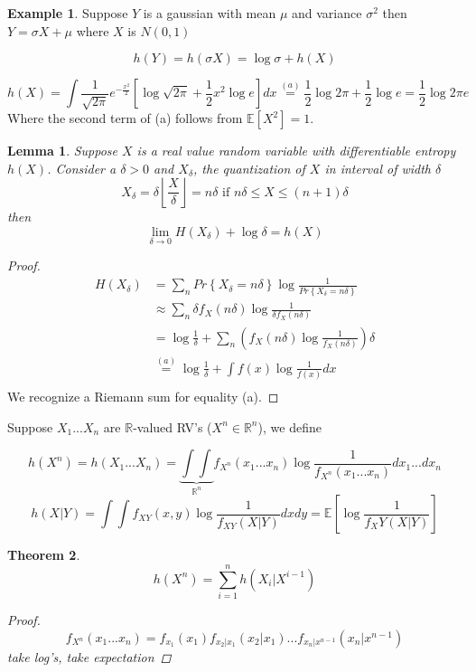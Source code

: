 \documentclass[twoside]{article}
\newtheorem{theorem}{Theorem}[section]
\newtheorem{lemma}[theorem]{Lemma}
\theoremstyle{definition} %
\newtheorem{example}{Example}
\renewcommand{\Pr}[1]{Pr\left\{#1\right\}}
\newcommand{\Ex}[1]{\mathbb{E}\left[#1\right]}
\newcommand{\overeq}[1]{\stackrel{#1}{=}}
\def\R{\mathbb{R}}
\begin{document}
\begin{example}
  Suppose $Y$ is a gaussian with mean $\mu$ and variance $\sigma^2$ then $Y=\sigma X + \mu$ where $X$ is $N(0,1)$

  \[
    h(Y) = h(\sigma X) = \log \sigma + h(X)
  \]

  \[
    h(X) = \int \frac 1 {\sqrt{2\pi}} e^{-\frac {x^2} 2} \left[ \log \sqrt{2\pi} + \frac 1 2 x^2 \log e \right] dx
    \overeq{(a)} \frac 1 2 \log 2\pi + \frac 1 2 \log e = \frac 1 2 \log 2\pi e
  \]
  Where the second term of (a) follows from $\Ex{X^2} = 1$.
\end{example}

\begin{lemma}
  Suppose $X$ is a real value random variable with differentiable entropy $h(X)$. Consider a $\delta > 0$ and $X_\delta$, the quantization of $X$ in interval of width $\delta$
  \[
    X_\delta = \delta \left\lfloor \frac X \delta \right\rfloor = n\delta \text{ if } n\delta \leq X \leq (n+1) \delta
  \]
  then
  \[
    \lim_{\delta \to 0} H(X_\delta) + \log \delta = h(X)
  \]
\end{lemma}

\begin{proof}
\begin{align*}
  H(X_\delta) &= \sum_n \Pr{X_\delta = n\delta} \log \frac 1 {\Pr{X_\delta = n\delta}}\\
  &\approx \sum_n \delta f_X(n\delta) \log \frac 1 {\delta f_X(n\delta)}\\
  &= \log \frac 1 \delta + \sum_n \left(f_X(n\delta) \log \frac 1 {f_X(n\delta)} \right)\delta\\
  &\overeq{(a)} \log \frac 1 \delta + \int f(x) \log \frac 1 {f(x)} dx\\
\end{align*}
We recognize a Riemann sum for equality (a).
\end{proof}




Suppose $X_1 ... X_n$ are $\R$-valued RV's ($X^n \in \R^n$), we define

\[
  h(X^n) = h(X_1 ... X_n) = \underbrace{\int \int}_{\R^n} f_{X^n} (x_1 ... x_n) \log \frac{1}{f_{X^n}(x_1 ... x_n)} dx_1...dx_n
\]
\[
  h(X|Y) = \int \int f_{XY}(x, y) \log \frac{1}{f_{XY}(X|Y)} dx dy = \Ex{\log \frac{1}{f_XY(X | Y)}}
\]

\begin{theorem}
  \[
    h(X^n) = \sum_{i = 1}^n h(X_i | X^{i - 1})
  \]
  \begin{proof}
    \[
      f_{X^n}(x_1 ... x_n) = f_{x_1}(x_1) f_{x_2 | x_1}(x_2 | x_1) ... f_{x_n | x^{n-1}}(x_n | x^{n-1})
    \]
    take log's, take expectation
  \end{proof}
\end{theorem}
\end{document}
